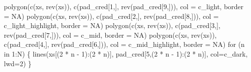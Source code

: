 \documentclass[
  letterpaper,
  DIV=11,
  numbers=noendperiod]{scrartcl}
\newenvironment{Shaded}{\begin{snugshade}}{\end{snugshade}}
\newcommand{\AttributeTok}[1]{\textcolor[rgb]{0.40,0.45,0.13}{#1}}
\newcommand{\ConstantTok}[1]{\textcolor[rgb]{0.56,0.35,0.01}{#1}}
\newcommand{\ControlFlowTok}[1]{\textcolor[rgb]{0.00,0.23,0.31}{#1}}
\newcommand{\DecValTok}[1]{\textcolor[rgb]{0.68,0.00,0.00}{#1}}
\newcommand{\FunctionTok}[1]{\textcolor[rgb]{0.28,0.35,0.67}{#1}}
\newcommand{\NormalTok}[1]{\textcolor[rgb]{0.00,0.23,0.31}{#1}}
\newcommand{\SpecialCharTok}[1]{\textcolor[rgb]{0.37,0.37,0.37}{#1}}
\begin{document}
\begin{Shaded}
\begin{Highlighting}[]
  \FunctionTok{polygon}\NormalTok{(}\FunctionTok{c}\NormalTok{(xs, }\FunctionTok{rev}\NormalTok{(xs)), }\FunctionTok{c}\NormalTok{(pad\_cred[}\DecValTok{1}\NormalTok{,], }\FunctionTok{rev}\NormalTok{(pad\_cred[}\DecValTok{9}\NormalTok{,])),}
          \AttributeTok{col =}\NormalTok{ c\_light, }\AttributeTok{border =} \ConstantTok{NA}\NormalTok{)}
  \FunctionTok{polygon}\NormalTok{(}\FunctionTok{c}\NormalTok{(xs, }\FunctionTok{rev}\NormalTok{(xs)), }\FunctionTok{c}\NormalTok{(pad\_cred[}\DecValTok{2}\NormalTok{,], }\FunctionTok{rev}\NormalTok{(pad\_cred[}\DecValTok{8}\NormalTok{,])),}
          \AttributeTok{col =}\NormalTok{ c\_light\_highlight, }\AttributeTok{border =} \ConstantTok{NA}\NormalTok{)}
  \FunctionTok{polygon}\NormalTok{(}\FunctionTok{c}\NormalTok{(xs, }\FunctionTok{rev}\NormalTok{(xs)), }\FunctionTok{c}\NormalTok{(pad\_cred[}\DecValTok{3}\NormalTok{,], }\FunctionTok{rev}\NormalTok{(pad\_cred[}\DecValTok{7}\NormalTok{,])),}
          \AttributeTok{col =}\NormalTok{ c\_mid, }\AttributeTok{border =} \ConstantTok{NA}\NormalTok{)}
  \FunctionTok{polygon}\NormalTok{(}\FunctionTok{c}\NormalTok{(xs, }\FunctionTok{rev}\NormalTok{(xs)), }\FunctionTok{c}\NormalTok{(pad\_cred[}\DecValTok{4}\NormalTok{,], }\FunctionTok{rev}\NormalTok{(pad\_cred[}\DecValTok{6}\NormalTok{,])),}
          \AttributeTok{col =}\NormalTok{ c\_mid\_highlight, }\AttributeTok{border =} \ConstantTok{NA}\NormalTok{)}
  \ControlFlowTok{for}\NormalTok{ (n }\ControlFlowTok{in} \DecValTok{1}\SpecialCharTok{:}\NormalTok{N) \{}
    \FunctionTok{lines}\NormalTok{(xs[(}\DecValTok{2} \SpecialCharTok{*}\NormalTok{ n }\SpecialCharTok{{-}} \DecValTok{1}\NormalTok{)}\SpecialCharTok{:}\NormalTok{(}\DecValTok{2} \SpecialCharTok{*}\NormalTok{ n)], pad\_cred[}\DecValTok{5}\NormalTok{,(}\DecValTok{2} \SpecialCharTok{*}\NormalTok{ n }\SpecialCharTok{{-}} \DecValTok{1}\NormalTok{)}\SpecialCharTok{:}\NormalTok{(}\DecValTok{2} \SpecialCharTok{*}\NormalTok{ n)],}
          \AttributeTok{col=}\NormalTok{c\_dark, }\AttributeTok{lwd=}\DecValTok{2}\NormalTok{)}
\NormalTok{  \}}


\end{Highlighting}
\end{Shaded}
\end{document}
